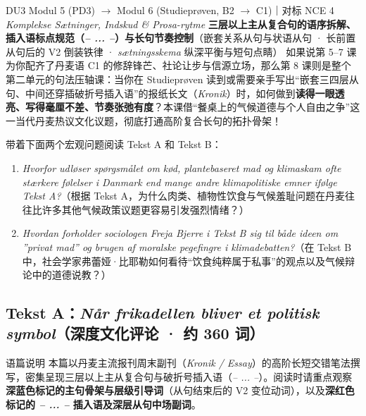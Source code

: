 {DU3 Modul 5 (PD3) $\rightarrow$ Modul 6 (Studieprøven, B2 $\rightarrow$ C1)｜对标 NCE 4 \textit{Komplekse Sætninger, Indskud \& Prosa-rytme}}
{\textbf{三层以上主从复合句的语序拆解、插入语标点规范（\textit{-- ... --}）与长句节奏控制}（嵌套关系从句与状语从句 · 长前置从句后的 V2 倒装铁律 · \textit{sætningsskema} 纵深平衡与短句点睛）}
{如果说第 5--7 课为你配齐了丹麦语 C1 的修辞锋芒、社论让步与信源立场，那么第 8 课则是整个第二单元的句法压轴课：当你在 Studieprøven 读到或需要亲手写出“嵌套三四层从句、中间还穿插破折号插入语”的报纸长文（\textit{Kronik}）时，如何做到\textbf{读得一眼透亮、写得毫厘不差、节奏张弛有度}？本课借“餐桌上的气候道德与个人自由之争”这一当代丹麦热议文化议题，彻底打通高阶复合长句的拓扑骨架！}

\begin{foerduleaeser}
带着下面两个宏观问题阅读 Tekst A 和 Tekst B：
\begin{enumerate}
  \item \textit{Hvorfor udløser spørgsmålet om kød, plantebaseret mad og klimaskam ofte stærkere følelser i Danmark end mange andre klimapolitiske emner ifølge Tekst A?}（根据 Tekst A，为什么肉类、植物性饮食与气候羞耻问题在丹麦往往比许多其他气候政策议题更容易引发强烈情绪？）
  \item \textit{Hvordan forholder sociologen Freja Bjerre i Tekst B sig til både ideen om ”privat mad” og brugen af moralske pegefingre i klimadebatten?}（在 Tekst B 中，社会学家弗蕾娅·比耶勒如何看待“饮食纯粹属于私事”的观点以及气候辩论中的道德说教？）
\end{enumerate}
\end{foerduleaeser}


\subsection*{Tekst A：\textit{Når frikadellen bliver et politisk symbol}（深度文化评论 · 约 360 词）}

\begin{tipbox}{语篇说明}
本篇以丹麦主流报刊周末副刊（\textit{Kronik / Essay}）的高阶长短交错笔法撰写，密集呈现三层以上主从复合句与破折号插入语（\textit{-- ... --}）。阅读时请重点观察\textbf{\color{NCDNavy}深蓝色标记的主句骨架与层级引导词}（从句结束后的 V2 变位动词），以及\textbf{\color{NCDRed}深红色标记的 \textit{-- ... --} 插入语及深层从句中场副词}。
\end{tipbox}

